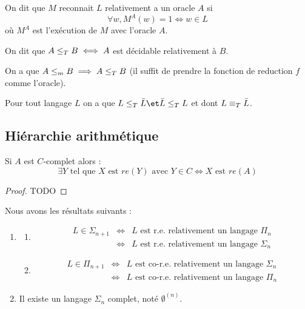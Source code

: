 \begin{definition}[Reconnaissance]

	On dit que $M$ reconnait $L$ relativement a un oracle $A$ si
	$$ \forall w, M^A (w) = 1 \iff w \in L $$
	où $M^A$ est l'exécution de $M$ avec l'oracle $A$.

\end{definition}

\begin{definition}
	On dit que $A \leq_T B \iff A$ est décidable relativement à $B$.
\end{definition}

\begin{remarque}
	On a que $A \leq_m B \implies A \leq_T B$ (il suffit de prendre la fonction de reduction $f$ comme l'oracle).
\end{remarque}

\begin{remarque}
	Pour tout langage $L$ on a que $L \leqt \bar L \et \bar L \leqt L$ et dont $L \equiv_T \bar L$.
\end{remarque}


\subsection{Hiérarchie arithmétique}

\begin{lemma}
	Si $A$ est $C$-complet alors :
	$$\exists Y \text{ tel que } X \text{ est } re(Y) \text{ avec } Y \in C \iff X \text{ est } re(A)$$
\end{lemma}


\begin{proof}
	TODO
\end{proof}

\begin{theorem}[de Post]
	Nous avons les résultats suivants :
	\begin{enumerate}
		\item \label{thm:post-1}
		      \begin{enumerate}
			      \item \label{thm:post-1a}
			            \begin{eqnarray*}
				            L \in \Sigma_{n+1} &\iff& L \text{ est r.e. relativement  un langage }  \Pi_n  \\
				            &\iff& L \text{ est r.e. relativement  un langage }  \Sigma_{n}
			            \end{eqnarray*}

			      \item
			            \begin{eqnarray*}
				            L \in \Pi_{n+1} &\iff& L \text{ est co-r.e. relativement  un langage }  \Sigma_n  \\
				            &\iff& L \text{ est co-r.e. relativement  un langage }  \Pi_n
			            \end{eqnarray*}
		      \end{enumerate}

		\item Il existe un langage $\Sigma_n$ complet, noté $\emptyset^{(n)}$.
	\end{enumerate}
\end{theorem}


